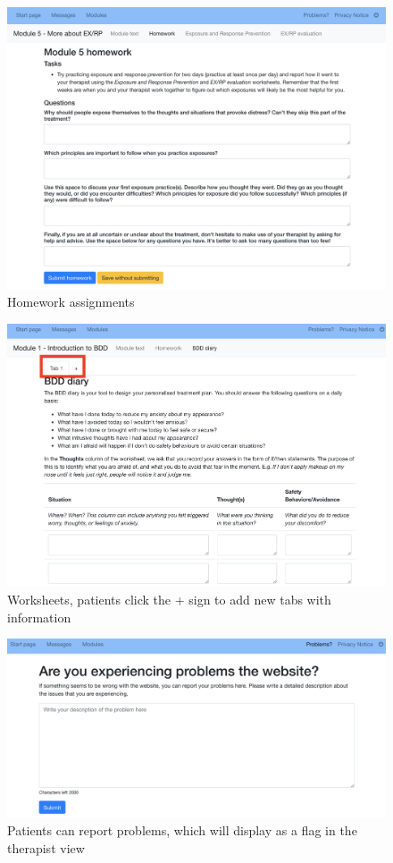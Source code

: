 \documentclass[]{book}
\theoremstyle{definition}
\theoremstyle{definition}
\theoremstyle{definition}
\theoremstyle{remark}
\begin{document}
\begin{figure}
\centering
\includegraphics{images/patient-homework.png}
\caption{Homework assignments}
\end{figure}

\begin{figure}
\centering
\includegraphics{images/patient-worksheet.png}
\caption{Worksheets, patients click the + sign to add new tabs with
information}
\end{figure}

\begin{figure}
\centering
\includegraphics{images/patient-problems.png}
\caption{Patients can report problems, which will display as a flag in
the therapist view}
\end{figure}
\end{document}
